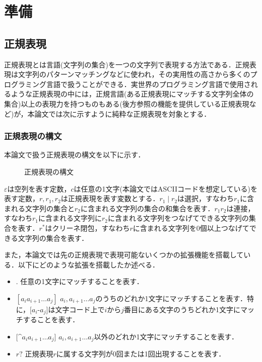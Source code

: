 \documentclass[a4paper, 12pt, dvipdfmx, uplatex]{jsreport}
\begin{document}
\chapter{準備}
\section{正規表現}
正規表現とは言語(文字列の集合)を一つの文字列で表現する方法である．正規表現は文字列のパターンマッチングなどに使われ，その実用性の高さから多くのプログラミング言語で扱うことができる．実世界のプログラミング言語で使用されるような正規表現の中には，正規言語(ある正規表現にマッチする文字列全体の集合)以上の表現力を持つものもある(後方参照の機能を提供している正規表現など)が，本論文では次に示すように純粋な正規表現を対象とする．

\subsection{正規表現の構文}
本論文で扱う正規表現の構文を以下に示す．
\begin{figure}[h]
  \centering
  \setlength{\fboxrule}{0.5pt}
  \caption{正規表現の構文}
  \label{fig:syntax-regex}
\end{figure}

$\varepsilon$は空列を表す定数，$c$は任意の1文字(本論文ではASCIIコードを想定している)を表す定数，$r,r_1,r_2$は正規表現を表す変数とする．$r_1 \mid r_2$は選択，すなわち$r_1$に含まれる文字列の集合と$r_2$に含まれる文字列の集合の和集合を表す．$r_1r_2$は連接，すなわち$r_1$に含まれる文字列に$r_2$に含まれる文字列をつなげてできる文字列の集合を表す．$r^*$はクリーネ閉包，すなわち$r$に含まれる文字列を0個以上つなげてできる文字列の集合を表す．

また，本論文では先の正規表現で表現可能ないくつかの拡張機能を搭載している．以下にどのような拡張を搭載したか述べる．
\begin{itemize}
  \item $.$ \quad 任意の1文字にマッチすることを表す．
  \item $[a_ia_{i+1}\ldots a_j]$ \quad $a_i,a_{i+1}\ldots a_j$のうちのどれか1文字にマッチすることを表す．特に，$[a_i$-$a_j]$は文字コード上で$i$から$j$番目にある文字のうちどれか1文字にマッチすることを表す．
  \item $[$^$a_ia_{i+1}\ldots a_j]$ \quad $a_i,a_{i+1}\ldots a_j$以外のどれか1文字にマッチすることを表す．
  \item $r?$ \quad 正規表現$r$に属する文字列が0回または1回出現することを表す．
\end{itemize}
\end{document}
